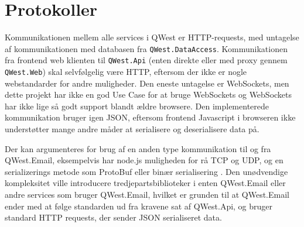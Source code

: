 
\section{Protokoller}\label{sec:protocols}
Kommunikationen mellem alle services i QWest er HTTP-requests, med untagelse af kommunikationen med databasen fra \texttt{QWest.DataAccess}. Kommunikationen fra frontend web klienten til \texttt{QWest.Api} (enten direkte eller med proxy gennem \texttt{QWest.Web}) skal selvfølgelig være HTTP, eftersom der ikke er nogle webstandarder for andre muligheder. Den eneste untagelse er WebSockets, men dette projekt har ikke en god Use Case\cite{Larman2004} for at bruge WebSockets og WebSockets har ikke lige så godt support blandt ældre browsere. Den implementerede kommunikation bruger igen JSON, eftersom frontend Javascript i browseren ikke understøtter mange andre måder at serialisere og deserialisere data på.

Der kan argumenteres for brug af en anden type kommunikation til og fra QWest.Email, eksempelvis har node.js muligheden for rå TCP og UDP, og en serializerings metode som ProtoBuf \cite{ProtoBuf} eller binær serialisering \cite{CsharpBinarySerialization}. Den unødvendige kompleksitet ville introducere tredjepartsbiblioteker i enten QWest.Email eller andre services som bruger QWest.Email, hvilket er grunden til at QWest.Email ender med at følge standarden ud fra kravene sat af QWest.Api, og bruger standard HTTP requests, der sender JSON serialiseret data.

